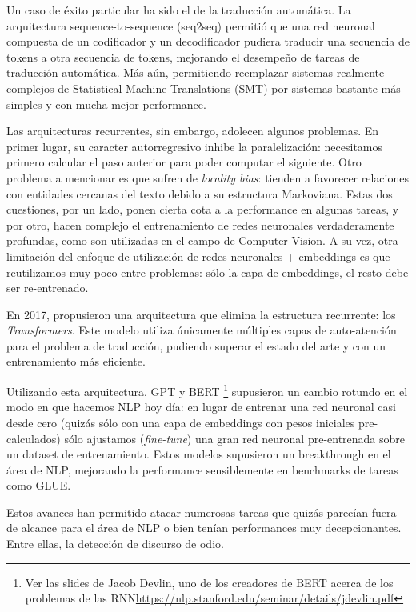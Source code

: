 Un caso de éxito particular ha sido el de la traducción automática. La arquitectura sequence-to-sequence (seq2seq) \cite{sutskever2014sequence} permitió que una red neuronal compuesta de un codificador y un decodificador pudiera traducir una secuencia de tokens a otra secuencia de tokens, mejorando el desempeño de tareas de traducción automática. Más aún, permitiendo reemplazar sistemas realmente complejos de Statistical Machine Translations (SMT) por sistemas bastante más simples y con mucha mejor performance.

Las arquitecturas recurrentes, sin embargo, adolecen algunos problemas. En primer lugar, su caracter autorregresivo inhibe la paralelización: necesitamos primero calcular el paso anterior para poder computar el siguiente. Otro problema a mencionar es que sufren de \emph{locality bias}: tienden a favorecer relaciones con entidades cercanas del texto debido a su estructura Markoviana. Estas dos cuestiones, por un lado, ponen cierta cota a la performance en algunas tareas, y por otro, hacen complejo el entrenamiento de redes neuronales verdaderamente profundas, como son utilizadas en el campo de Computer Vision. A su vez, otra limitación del enfoque de utilización de redes neuronales + embeddings es que reutilizamos muy poco entre problemas: sólo la capa de embeddings, el resto debe ser re-entrenado.

En 2017, \citet{vaswani2017attention} propusieron una arquitectura que elimina la estructura recurrente: los \emph{Transformers}. Este modelo utiliza únicamente múltiples capas de auto-atención para el problema de traducción, pudiendo superar el estado del arte y con un entrenamiento más eficiente.

Utilizando esta arquitectura, GPT y BERT
\footnote{Ver las slides de Jacob Devlin, uno de los creadores de BERT acerca de los problemas de las RNN\url{https://nlp.stanford.edu/seminar/details/jdevlin.pdf}} supusieron un cambio rotundo en el modo en que hacemos NLP hoy día: en lugar de entrenar una red neuronal casi desde cero (quizás sólo con una capa de embeddings con pesos iniciales pre-calculados) sólo ajustamos (\emph{fine-tune}) una gran red neuronal pre-entrenada sobre un dataset de entrenamiento. Estos modelos supusieron un breakthrough en el área de NLP, mejorando la performance sensiblemente en benchmarks de tareas como GLUE.

Estos avances han permitido atacar numerosas tareas que quizás parecían fuera de alcance para el área de NLP o bien tenían performances muy decepcionantes. Entre ellas, la detección de discurso de odio.


